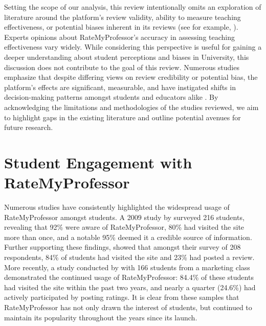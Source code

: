 \documentclass[man,12pt]{apa7}
\begin{document}
Setting the scope of our analysis, this review intentionally omits an exploration of literature around the platform's review validity, ability to measure teaching effectiveness, or potential biases inherent in its reviews (see for example, \textcite{reid_role_2010,hartman_what_2013, azab_analysing_2016, boring_gender_2017, rosen_correlations_2018, baker_quantcrit_2019, gordon_role_2021}). Experts opinions about RateMyProfessor’s accuracy in assessing teaching effectiveness vary widely. While considering this perspective is useful for gaining a deeper understanding about student perceptions and biases in University, this discussion does not contribute to the goal of this review.  Numerous studies emphasize that despite differing views on review credibility or potential bias, the platform's effects are significant, measurable, and have instigated shifts in decision-making patterns amongst students and educators alike \textcite{johnson_i_2014, boswell_ratemyprofessors_2016, boswell_effects_2020}. By acknowledging the limitations and methodologies of the studies reviewed, we aim to highlight gaps in the existing literature and outline potential avenues for future research.

\section{Student Engagement with RateMyProfessor}
Numerous studies have consistently highlighted the widespread usage of RateMyProfessor amongst students. A 2009 study by \textcite{davison_how_2009} surveyed 216 students, revealing that 92\% were aware of RateMyProfessor, 80\% had visited the site more than once, and a notable 95\% deemed it a credible source of information. Further supporting these findings, \textcite{bleske-rechek_ratemyprofessors_2010} showed that amongst their survey of 208 respondents, 84\% of students had visited the site and 23\% had posted a review. More recently, a study conducted by \textcite{chiang_students_2017} with 166 students from a marketing class demonstrated the continued usage of RateMyProfessor: 84.4\% of these students had visited the site within the past two years, and nearly a quarter (24.6\%) had actively participated by posting ratings. It is clear from these samples that RateMyProfessor has not only drawn the interest of students, but continued to maintain its popularity throughout the years since its launch.
\end{document}

